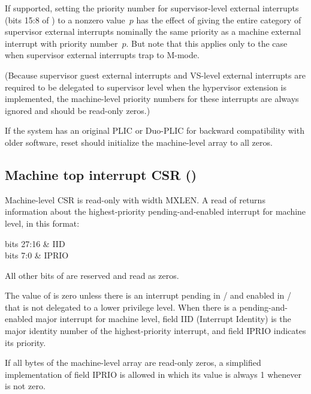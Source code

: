 If supported, setting the priority number for supervisor-level external
interrupts (bits 15:8 of ) to a nonzero value~$p$ has the
effect of giving the entire category of supervisor external interrupts
nominally the same priority as a machine external interrupt with
priority number~$p$.
But note that this applies only to the case when supervisor external
interrupts trap to \mbox{M-mode}.

(Because supervisor guest external interrupts and VS-level external
interrupts are required to be delegated to supervisor level when the
hypervisor extension is implemented, the machine-level priority numbers
for these interrupts are always ignored and should be read-only zeros.)

If the system has an original PLIC or \mbox{Duo-PLIC} for backward
compatibility with older software, reset should initialize the
machine-level  array to all zeros.

\subsection{Machine top interrupt CSR ()}
\label{sec:mtopi}

Machine-level CSR  is read-only with width MXLEN.
A read of  returns information about the highest-priority
pending-and-enabled interrupt for machine level, in this
format:\nopagebreak
\begin{displayLinesTable}[l@{\quad}l]
bits 27:16 & IID \\
bits 7:0   & IPRIO \\
\end{displayLinesTable}
All other bits of  are reserved and read as zeros.

The value of  is zero unless there is an interrupt pending in
/ and enabled in / that is not delegated
to a lower privilege level.
When there is a pending-and-enabled major interrupt for machine
level, field IID (Interrupt Identity) is the major identity number of
the highest-priority interrupt, and field IPRIO indicates its priority.

If all bytes of the machine-level  array are read-only zeros,
a simplified implementation of field IPRIO is allowed in which its
value is always 1 whenever  is not zero.

